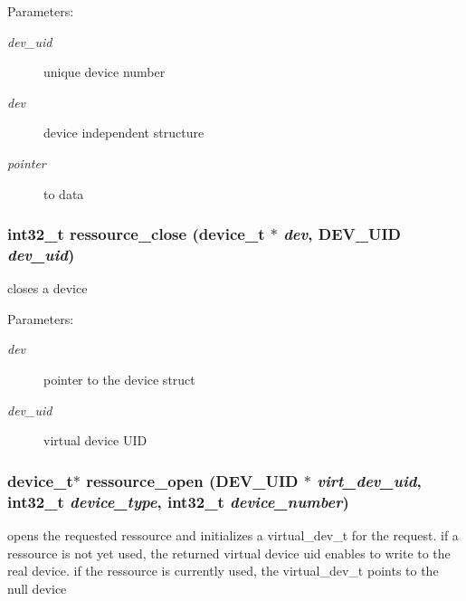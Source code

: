 \begin{Desc}
\item[Parameters:]
\begin{description}
\item[{\em dev\_\-uid}]unique device number \item[{\em dev}]device independent structure \item[{\em pointer}]to data \end{description}
\end{Desc}
\hypertarget{group___r_e_s_o_u_r_c_e___m_g271870da508ff83711dac2abc49871c9}{
\subsubsection[{ressource\_\-close}]{\setlength{\rightskip}{0pt plus 5cm}int32\_\-t ressource\_\-close (device\_\-t $\ast$ {\em dev}, \/  {\bf DEV\_\-UID} {\em dev\_\-uid})}}
\label{group___r_e_s_o_u_r_c_e___m_g271870da508ff83711dac2abc49871c9}


closes a device 

\begin{Desc}
\item[Parameters:]
\begin{description}
\item[{\em dev}]pointer to the device struct \item[{\em dev\_\-uid}]virtual device UID \end{description}
\end{Desc}
\hypertarget{group___r_e_s_o_u_r_c_e___m_g09c6c96465e7bed0f3026fec51dbf1fc}{
\subsubsection[{ressource\_\-open}]{\setlength{\rightskip}{0pt plus 5cm}device\_\-t$\ast$ ressource\_\-open ({\bf DEV\_\-UID} $\ast$ {\em virt\_\-dev\_\-uid}, \/  int32\_\-t {\em device\_\-type}, \/  int32\_\-t {\em device\_\-number})}}
\label{group___r_e_s_o_u_r_c_e___m_g09c6c96465e7bed0f3026fec51dbf1fc}


opens the requested ressource and initializes a virtual\_\-dev\_\-t for the request. if a ressource is not yet used, the returned virtual device uid enables to write to the real device. if the ressource is currently used, the virtual\_\-dev\_\-t points to the null device 

